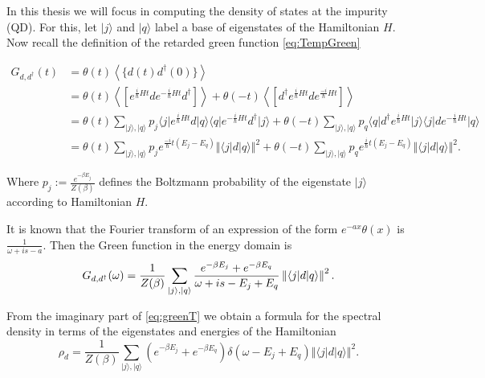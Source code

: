 
In this thesis we will focus in computing the density of states at the impurity (QD). For this, let $\vert j\rangle$ and $\vert q \rangle$ label a base of eigenstates of the Hamiltonian $H$. Now recall the definition of the retarded green function \eqref{eq:TempGreen}

\begin{align}
G_{d,d^{\dagger}}(t)&=\theta(t)\left\langle \{ d(t)d^{\dagger}(0) \} \right\rangle \\ \label{eq:MeanGreen}
&=\theta(t)\left\langle \left[e^{\frac{i}{\hbar}Ht}de^{-\frac{i}{\hbar}Ht}d^{\dagger}\right]\right\rangle +\theta(-t)\left\langle \left[d^{\dagger}e^{\frac{i}{\hbar}Ht}de^{\frac{-i}{\hbar}Ht}\right]\right\rangle \\
&=\theta(t)\sum_{\vert j\rangle,\vert q\rangle}p_{j}\langle j\vert e^{\frac{i}{\hbar}Ht}d\vert q\rangle\langle q\vert e^{-\frac{i}{\hbar}Ht}d^{\dagger}\vert j\rangle+\theta(-t)\sum_{\vert j\rangle,\vert q\rangle}p_{q}\langle q\vert d^{\dagger}e^{\frac{i}{\hbar}Ht}\vert j\rangle\langle j\vert de^{-\frac{i}{\hbar}Ht}\vert q\rangle\\
&=\theta(t)\sum_{\vert j\rangle,\vert q\rangle}p_{j}e^{\frac{-i}{\hbar}t\left(E_{j}-E_{q}\right)}\left\Vert \langle j\vert d\vert q\rangle\right\Vert ^{2}+\theta(-t)\sum_{\vert j\rangle,\vert q\rangle}p_{q}e^{\frac{i}{\hbar}t\left(E_{j}-E_{q}\right)}\left\Vert \langle j\vert d\vert q\rangle\right\Vert ^{2}.
\end{align}

\noindent Where $p_{j}:=\frac{e^{-\beta E_{j}}}{Z(\beta)}$ defines the Boltzmann probability of the eigenstate $\vert j\rangle$ according to Hamiltonian $H$. 

It is known that the Fourier transform of an expression of the form ${\displaystyle e^{-ax}\theta(x)}$ is $\frac{1}{\omega+is-a}$. Then the Green function in the energy domain is 
\begin{equation}
G_{d,d^{\dagger}}(\omega)=\frac{1}{Z(\beta)}\sum_{\vert j\rangle,\vert q\rangle}{\displaystyle \frac{e^{-\beta E_{j}}+e^{-\beta E_{q}}}{\omega+is-E_{j}+E_{q}}}\left\Vert \langle j\vert d\vert q\rangle\right\Vert ^{2}
. \label{eq:greenT}
\end{equation}

\noindent From the imaginary part of \eqref{eq:greenT} we obtain a formula for the spectral density in terms of the eigenstates and energies of the Hamiltonian 
\begin{equation}
\rho_{d}=\frac{1}{Z(\beta)}\sum_{\vert j\rangle,\vert q\rangle}{\displaystyle \left(e^{-\beta E_{j}}+e^{-\beta E_{q}} \right) \delta\left(\omega-E_{j}+E_{q} \right) } \left\Vert \langle j\vert d\vert q\rangle \right\Vert^{2}. \label{eq:DOSeigenstates}
\end{equation}

